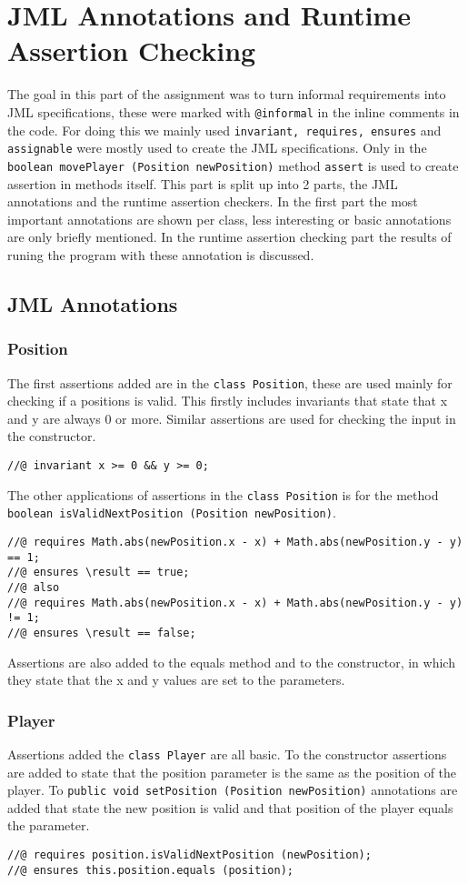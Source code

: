 \documentclass[a4paper]{article}
\begin{document}
	\section{JML Annotations and Runtime Assertion Checking}
	The goal in this part of the assignment was to turn informal requirements into JML specifications, these were marked with \texttt{@informal} in the inline comments in the code. For doing this we mainly used \texttt{invariant, requires, ensures} and \texttt{assignable} were mostly used to create the JML specifications. Only in the \texttt{boolean movePlayer (Position newPosition)} method \texttt{assert} is used to create assertion in methods itself. This part is split up into 2 parts, the JML annotations and the runtime assertion checkers. In the first part the most important annotations are shown per class, less interesting or basic annotations are only briefly mentioned. In the runtime assertion checking part the results of runing the program with these annotation is discussed.

	\subsection{JML Annotations}
	\subsubsection{Position}
	The first assertions added are in the \texttt{class Position}, these are used mainly for checking if a positions is valid. This firstly includes invariants that state that x and y are always 0 or more. Similar assertions are used for checking the input in the constructor.
	\begin{lstlisting}
//@ invariant x >= 0 && y >= 0;
	\end{lstlisting}
	The other applications of assertions in the \texttt{class Position} is for the method \texttt{boolean isValidNextPosition (Position newPosition)}. 
	\begin{lstlisting}
//@ requires Math.abs(newPosition.x - x) + Math.abs(newPosition.y - y) == 1;
//@ ensures \result == true;
//@ also
//@ requires Math.abs(newPosition.x - x) + Math.abs(newPosition.y - y) != 1;
//@ ensures \result == false;
	\end{lstlisting}
	Assertions are also added to the equals method and to the constructor, in which they state that the x and y values are set to the parameters.
	
	\subsubsection{Player}
	Assertions added the \texttt{class Player} are all basic. To the constructor assertions are added to state that the position parameter is the same as the position of the player. To \texttt{public void setPosition (Position newPosition)} annotations are added that state the new position is valid and that position of the player equals the parameter.
	\begin{lstlisting}
//@ requires position.isValidNextPosition (newPosition);
//@ ensures this.position.equals (position);
	\end{lstlisting} 
	
\end{document}
